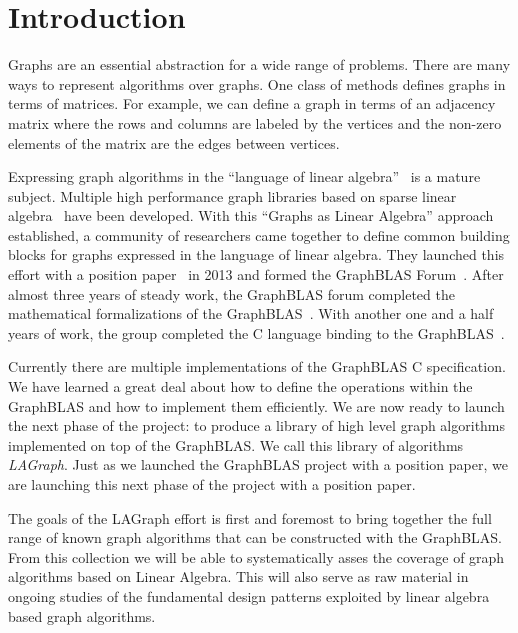\section{Introduction}
\label{sec:intro}



Graphs are an essential abstraction for a wide range of problems.  There are 
many ways to represent algorithms over graphs.  One class of methods defines
graphs in terms of matrices.  For example, we can define a graph in terms of an 
adjacency matrix where the rows and columns are labeled by the vertices and the
non-zero elements of the matrix are the edges between vertices.  

Expressing graph algorithms in the ``language of linear
algebra''~\cite{kepner2011graph} is a mature subject.  Multiple 
high performance graph libraries based on sparse 
linear algebra~\cite{combblas,
gadepally2015graphulo, gpi2016, sundaram2015graphmat,che2016programming}
have been developed.   With this ``Graphs as Linear Algebra'' approach established, 
a community of researchers came together to define common building
blocks for graphs expressed in the language of linear algebra.  They launched
this effort with a position paper~\cite{hpec13} in 2013 and formed the GraphBLAS
Forum~\cite{graphblas_web}.  After almost three years of steady work,
the GraphBLAS forum completed the
mathematical formalizations of the GraphBLAS~\cite{mathgraphblas16}. With another 
one and a half years of work, the group completed the C
language binding to the GraphBLAS~\cite{cspec}.

Currently there are multiple implementations of the GraphBLAS C specification.  
We have learned a great deal about how to define the operations within the GraphBLAS 
and how to implement them efficiently.  We are now ready to launch the next phase of the project:
to produce a library of high level graph algorithms implemented on top of the GraphBLAS.
We call this library of algorithms \emph{LAGraph}.
Just as we launched the GraphBLAS project with a position paper, we are launching 
this next phase of the project with a position paper.  

The goals of the LAGraph effort is first and foremost to bring together the full 
range of known graph algorithms that can be constructed with the GraphBLAS.
From this collection we will be able to systematically asses the coverage of 
graph algorithms based on Linear Algebra. This will also serve
as raw material in ongoing studies of the fundamental design patterns exploited 
by linear algebra based graph algorithms. 

